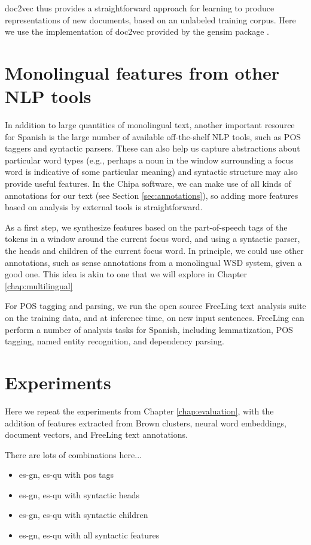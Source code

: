 doc2vec thus provides a straightforward approach for learning to produce
representations of new documents, based on an unlabeled training corpus. Here
we use the implementation of doc2vec provided by the gensim package
\cite{rehurek-lrec}.

\section{Monolingual features from other NLP tools}
In addition to large quantities of monolingual text, another important resource
for Spanish is the large number of available off-the-shelf NLP tools, such as
POS taggers and syntactic parsers. These can also help us capture abstractions
about particular word types (e.g., perhaps a noun in the window surrounding a
focus word is indicative of some particular meaning) and syntactic structure
may also provide useful features.  In the Chipa software, we can make use of
all kinds of annotations for our text (see Section \ref{sec:annotations}), so
adding more features based on analysis by external tools is straightforward.

As a first step, we synthesize features based on the part-of-speech tags of the
tokens in a window around the current focus word, and using a syntactic parser,
the heads and children of the current focus word.
In principle, we could use other annotations, such as sense annotations from a
monolingual WSD system, given a good one.
This idea is akin to one that we will explore in Chapter
\ref{chap:multilingual}

For POS tagging and parsing, we run the open source FreeLing text analysis
suite \cite{padro12} on the training data, and at inference time, on new input
sentences. FreeLing can perform a number of analysis tasks for Spanish,
including lemmatization, POS tagging, named entity recognition, and dependency
parsing.

\section{Experiments}
Here we repeat the experiments from Chapter \ref{chap:evaluation}, with the
addition of features extracted from Brown clusters, neural word embeddings,
document vectors, and FreeLing text annotations.

There are lots of combinations here...

\begin{itemize}
  \item es-gn, es-qu with pos tags
  \item es-gn, es-qu with syntactic heads
  \item es-gn, es-qu with syntactic children
  \item es-gn, es-qu with all syntactic features
\end{itemize}

